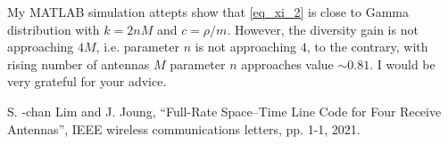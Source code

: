 \documentclass{article}
\begin{document}
My MATLAB simulation attepts show that \eqref{eq_xi_2} is close to Gamma distribution with $k=2nM$ and $c = \rho/m$. However, the diversity gain is not approaching $4M$, i.e. parameter $n$ is not approaching $4$, to the contrary, with rising number of antennas $M$ parameter $n$ approaches value $\sim 0.81$.   
I would be very grateful for your advice.


\begin{thebibliography}{00}

 S. -chan Lim and J. Joung, “Full-Rate Space–Time Line Code for Four Receive Antennas”, IEEE wireless communications letters, pp. 1-1, 2021.

\end{thebibliography}
\end{document}
